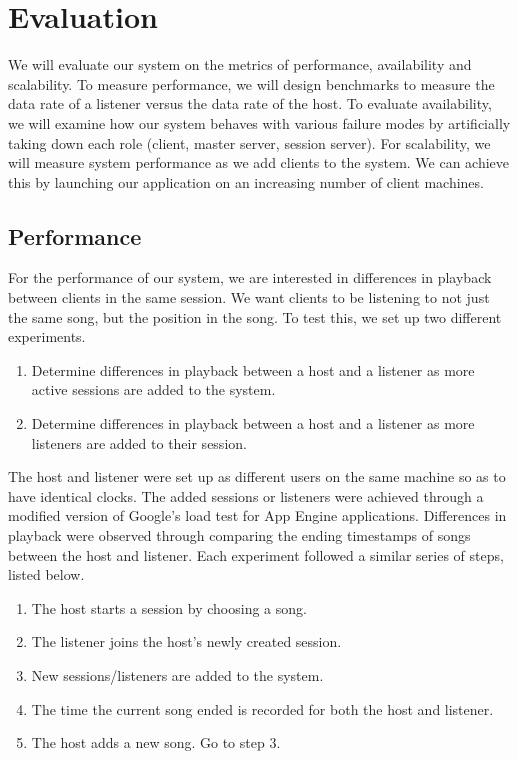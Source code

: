 \section{Evaluation}
\label{sec:eval}
We will evaluate our system on the metrics of performance, 
availability and scalability. To measure performance, 
we will design benchmarks to measure the data rate 
of a listener versus the data rate of the host. To 
evaluate availability, we will examine how our system 
behaves with various failure modes by artificially 
taking down each role (client, master server, session 
server). For scalability, we will measure system 
performance as we add clients to the system. We can 
achieve this by launching our application on an 
increasing number of client machines.

\subsection{Performance}

For the performance of our system, we are interested in
differences in playback between clients in the same session.
We want clients to be listening to not just the same song,
but the position in the song. To test this, we set up two
different experiments.

\begin{enumerate}

\item Determine differences in playback between a host and a
listener as more active sessions are added to the system.

\item Determine differences in playback between a host and a
listener as more listeners are added to their session.

\end{enumerate}

The host and listener were set up as different users on the same machine
so as to have identical clocks. The added sessions or listeners
were achieved through a modified version of Google's load test
for App Engine applications. Differences in playback were observed
through comparing the ending timestamps of songs between the host
and listener. Each experiment followed a similar series of steps,
listed below.

\begin{enumerate}

\item The host starts a session by choosing a song.

\item The listener joins the host's newly created session.

\item New sessions/listeners are added to the system.

\item The time the current song ended is recorded for both the
host and listener.

\item The host adds a new song. Go to step 3.

\end{enumerate}


